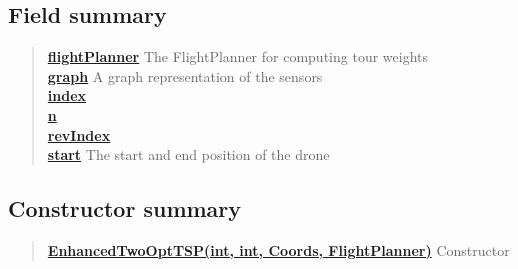\documentclass[11pt,a4paper]{report}
\begin{document}
{{{{{{{{{{{\subsection{Field summary}{
\begin{verse}
\hyperlink{uk.ac.ed.inf.aqmaps.flightplanning.EnhancedTwoOptTSP.flightPlanner}{{\bf flightPlanner}} The FlightPlanner for computing tour weights\\
\hyperlink{uk.ac.ed.inf.aqmaps.flightplanning.EnhancedTwoOptTSP.graph}{{\bf graph}} A graph representation of the sensors\\
\hyperlink{uk.ac.ed.inf.aqmaps.flightplanning.EnhancedTwoOptTSP.index}{{\bf index}} \\
\hyperlink{uk.ac.ed.inf.aqmaps.flightplanning.EnhancedTwoOptTSP.n}{{\bf n}} \\
\hyperlink{uk.ac.ed.inf.aqmaps.flightplanning.EnhancedTwoOptTSP.revIndex}{{\bf revIndex}} \\
\hyperlink{uk.ac.ed.inf.aqmaps.flightplanning.EnhancedTwoOptTSP.start}{{\bf start}} The start and end position of the drone\\
\end{verse}
}
\subsection{Constructor summary}{
\begin{verse}
\hyperlink{uk.ac.ed.inf.aqmaps.flightplanning.EnhancedTwoOptTSP(int, int, uk.ac.ed.inf.aqmaps.geometry.Coords, uk.ac.ed.inf.aqmaps.flightplanning.FlightPlanner)}{{\bf EnhancedTwoOptTSP(int, int, Coords, FlightPlanner)}} Constructor\\
\end{verse}
}
}}}}}}}}}}}
\end{document}
